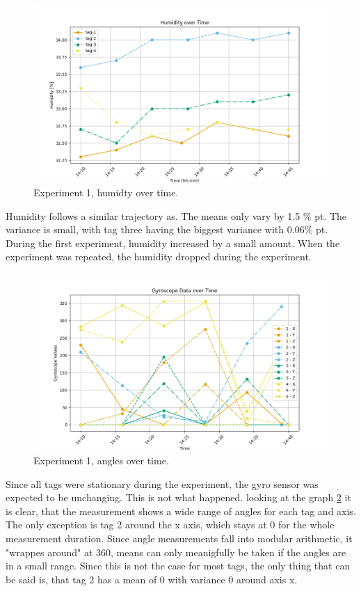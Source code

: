 \begin{figure}[ht!]
	\includegraphics[width=\linewidth]{graphics/exp/exp1_hum_plot_0.png}
	\caption{Experiment 1, humidty over time.}
	\label{f:exp1_graphs_hum}
\end{figure}

Humidity follows a similar trajectory as.
The means only vary by 1.5 \% pt.
The variance is small, with tag three having the biggest variance with 0.06\% pt.
During the first experiment, humidity increased by a small amount.
When the experiment was repeated, the humidity dropped during the experiment.


\begin{figure}[ht!]
	\includegraphics[width=\linewidth]{graphics/exp/exp1_gyro_data_plot_0.png}
	\caption{Experiment 1, angles over time.}
	\label{f:exp1_graphs_gyro}
\end{figure}

Since all tags were stationary during the experiment, the gyro sensor was expected to be unchanging.
This is not what happened.
looking at the graph \ref{f:exp1_graphs_gyro} it is clear, that the measurement shows a wide range of angles for each tag and axis.
The only exception is tag 2 around the x axis, which stays at 0 for the whole measurement duration.
Since angle measurements fall into modular arithmetic, it "wrappes around" at 360\degree , means can only meanigfully be taken if the angles are in a small range.
Since this is not the case for most tags, the only thing that can be said is, that tag 2 has a mean of 0 with variance 0 around axis x.


